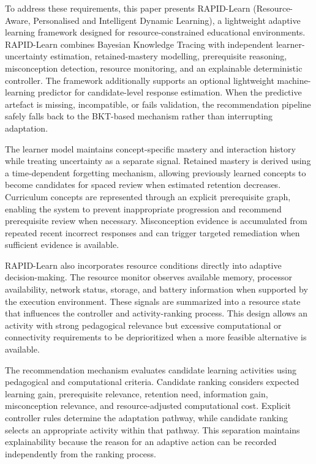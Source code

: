 \documentclass[conference]{IEEEtran}
\begin{document}
To address these requirements, this paper presents RAPID-Learn (Resource-Aware, Personalised and Intelligent Dynamic Learning), a lightweight adaptive learning framework designed for resource-constrained educational environments. RAPID-Learn combines Bayesian Knowledge Tracing with independent learner-uncertainty estimation, retained-mastery modelling, prerequisite reasoning, misconception detection, resource monitoring, and an explainable deterministic controller. The framework additionally supports an optional lightweight machine-learning predictor for candidate-level response estimation. When the predictive artefact is missing, incompatible, or fails validation, the recommendation pipeline safely falls back to the BKT-based mechanism rather than interrupting adaptation.

The learner model maintains concept-specific mastery and interaction history while treating uncertainty as a separate signal. Retained mastery is derived using a time-dependent forgetting mechanism, allowing previously learned concepts to become candidates for spaced review when estimated retention decreases. Curriculum concepts are represented through an explicit prerequisite graph, enabling the system to prevent inappropriate progression and recommend prerequisite review when necessary. Misconception evidence is accumulated from repeated recent incorrect responses and can trigger targeted remediation when sufficient evidence is available.

RAPID-Learn also incorporates resource conditions directly into adaptive decision-making. The resource monitor observes available memory, processor availability, network status, storage, and battery information when supported by the execution environment. These signals are summarized into a resource state that influences the controller and activity-ranking process. This design allows an activity with strong pedagogical relevance but excessive computational or connectivity requirements to be deprioritized when a more feasible alternative is available.

The recommendation mechanism evaluates candidate learning activities using pedagogical and computational criteria. Candidate ranking considers expected learning gain, prerequisite relevance, retention need, information gain, misconception relevance, and resource-adjusted computational cost. Explicit controller rules determine the adaptation pathway, while candidate ranking selects an appropriate activity within that pathway. This separation maintains explainability because the reason for an adaptive action can be recorded independently from the ranking process.
\end{document}
